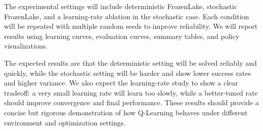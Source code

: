 \documentclass[11pt]{article}
\begin{document}
The experimental settings will include deterministic FrozenLake, stochastic FrozenLake, and a learning-rate ablation in the stochastic case. Each condition will be repeated with multiple random seeds to improve reliability. We will report results using learning curves, evaluation curves, summary tables, and policy visualizations.

The expected results are that the deterministic setting will be solved reliably and quickly, while the stochastic setting will be harder and show lower success rates and higher variance. We also expect the learning-rate study to show a clear tradeoff: a very small learning rate will learn too slowly, while a better-tuned rate should improve convergence and final performance. These results should provide a concise but rigorous demonstration of how Q-Learning behaves under different environment and optimization settings.



\end{document}
